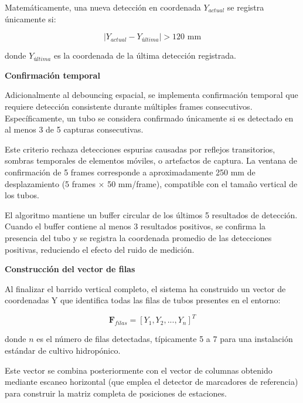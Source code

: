Matemáticamente, una nueva detección en coordenada $Y_{actual}$ se registra únicamente si:

\begin{equation}
|Y_{actual} - Y_{última}| > 120 \text{ mm}
\end{equation}

donde $Y_{última}$ es la coordenada de la última detección registrada.

\textbf{Confirmación temporal}

Adicionalmente al debouncing espacial, se implementa confirmación temporal que requiere detección consistente durante múltiples frames consecutivos. Específicamente, un tubo se considera confirmado únicamente si es detectado en al menos 3 de 5 capturas consecutivas.

Este criterio rechaza detecciones espurias causadas por reflejos transitorios, sombras temporales de elementos móviles, o artefactos de captura. La ventana de confirmación de 5 frames corresponde a aproximadamente 250 mm de desplazamiento (5 frames × 50 mm/frame), compatible con el tamaño vertical de los tubos.

El algoritmo mantiene un buffer circular de los últimos 5 resultados de detección. Cuando el buffer contiene al menos 3 resultados positivos, se confirma la presencia del tubo y se registra la coordenada promedio de las detecciones positivas, reduciendo el efecto del ruido de medición.

\textbf{Construcción del vector de filas}

Al finalizar el barrido vertical completo, el sistema ha construido un vector de coordenadas Y que identifica todas las filas de tubos presentes en el entorno:

\begin{equation}
\mathbf{F}_{filas} = [Y_1, Y_2, ..., Y_n]^T
\end{equation}

donde $n$ es el número de filas detectadas, típicamente 5 a 7 para una instalación estándar de cultivo hidropónico.

Este vector se combina posteriormente con el vector de columnas obtenido mediante escaneo horizontal (que emplea el detector de marcadores de referencia) para construir la matriz completa de posiciones de estaciones.